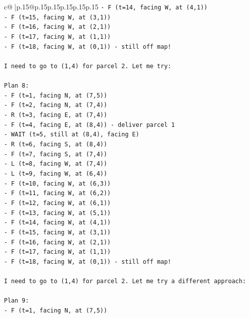 \documentclass{article}
\begin{document}
{\begin{supertabular}{c@{$\;$}|p{.15\linewidth}@{}p{.15\linewidth}p{.15\linewidth}p{.15\linewidth}p{.15\linewidth}p{.15\linewidth}}
{{{\texttt{{-} F (t=14, facing W, at (4,1))} \\
\texttt{{-} F (t=15, facing W, at (3,1))} \\
\texttt{{-} F (t=16, facing W, at (2,1))} \\
\texttt{{-} F (t=17, facing W, at (1,1))} \\
\texttt{{-} F (t=18, facing W, at (0,1)) {-} still off map!} \\
\\ 
\texttt{I need to go to (1,4) for parcel 2. Let me try:} \\
\\ 
\texttt{Plan 8:} \\
\texttt{{-} F (t=1, facing N, at (7,5))} \\
\texttt{{-} F (t=2, facing N, at (7,4))} \\
\texttt{{-} R (t=3, facing E, at (7,4))} \\
\texttt{{-} F (t=4, facing E, at (8,4)) {-} deliver parcel 1} \\
\texttt{{-} WAIT (t=5, still at (8,4), facing E)} \\
\texttt{{-} R (t=6, facing S, at (8,4))} \\
\texttt{{-} F (t=7, facing S, at (7,4))} \\
\texttt{{-} L (t=8, facing W, at (7,4))} \\
\texttt{{-} L (t=9, facing W, at (6,4))} \\
\texttt{{-} F (t=10, facing W, at (6,3))} \\
\texttt{{-} F (t=11, facing W, at (6,2))} \\
\texttt{{-} F (t=12, facing W, at (6,1))} \\
\texttt{{-} F (t=13, facing W, at (5,1))} \\
\texttt{{-} F (t=14, facing W, at (4,1))} \\
\texttt{{-} F (t=15, facing W, at (3,1))} \\
\texttt{{-} F (t=16, facing W, at (2,1))} \\
\texttt{{-} F (t=17, facing W, at (1,1))} \\
\texttt{{-} F (t=18, facing W, at (0,1)) {-} still off map!} \\
\\ 
\texttt{I need to go to (1,4) for parcel 2. Let me try a different approach:} \\
\\ 
\texttt{Plan 9:} \\
\texttt{{-} F (t=1, facing N, at (7,5))} \\
}}}
\end{supertabular}}
\end{document}
